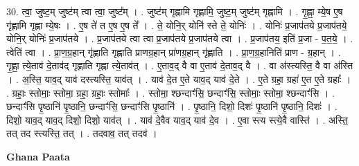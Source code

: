 \documentclass[17pt]{extarticle}
\begin{document}
30. त्वा॒ जुष्ट॒म् जुष्ट॑म् त्वा त्वा॒ जुष्ट᳚म् । . जुष्ट॑म् गृह्णामि गृह्णामि॒ जुष्ट॒म् जुष्ट॑म् गृह्णामि । . गृ॒ह्णा॒ म्ये॒ष ए॒ष गृ॑ह्णामि गृह्णा म्ये॒षः । . ए॒ष ते॑ त ए॒ष ए॒ष ते᳚ । . ते॒ योनि॒र् योनि॑ स्ते ते॒ योनिः॑ । . योनिः॑ प्र॒जाप॑तये प्र॒जाप॑तये॒ योनि॒र् योनिः॑ प्र॒जाप॑तये । . प्र॒जाप॑तये त्वा त्वा प्र॒जाप॑तये प्र॒जाप॑तये त्वा । . प्र॒जाप॑तय॒ इति॑ प्र॒जा - प॒त॒ये॒ । . त्वेति॑ त्वा । . प्रा॒ण॒ग्र॒हान् गृ॑ह्णाति गृह्णाति प्राणग्र॒हान् प्रा॑णग्र॒हान् गृ॑ह्णाति । . प्रा॒ण॒ग्र॒हानिति॑ प्राण - ग्र॒हान् । . गृ॒ह्णा॒ त्ये॒ताव॑ दे॒ताव॑द् गृह्णाति गृह्णा त्ये॒ताव॑त् । . ए॒ताव॒द् वै वा ए॒ताव॑ दे॒ताव॒द् वै । . वा अ॑स्त्यस्ति॒ वै वा अ॑स्ति । . अ॒स्ति॒ याव॒द् याव॑ दस्त्यस्ति॒ याव॑त् । . याव॑ दे॒त ए॒ते याव॒द् याव॑ दे॒ते । . ए॒ते ग्रहा॒ ग्रहा॑ ए॒त ए॒ते ग्रहाः᳚ । . ग्रहाः॒ स्तोमाः॒ स्तोमा॒ ग्रहा॒ ग्रहाः॒ स्तोमाः᳚ । . स्तोमा॒ श्छन्दाꣳ॑सि॒ छन्दाꣳ॑सि॒ स्तोमाः॒ स्तोमा॒ श्छन्दाꣳ॑सि । . छन्दाꣳ॑सि पृ॒ष्ठानि॑ पृ॒ष्ठानि॒ छन्दाꣳ॑सि॒ छन्दाꣳ॑सि पृ॒ष्ठानि॑ । . पृ॒ष्ठानि॒ दिशो॒ दिशः॑ पृ॒ष्ठानि॑ पृ॒ष्ठानि॒ दिशः॑ । . दिशो॒ याव॒द् याव॒द् दिशो॒ दिशो॒ याव॑त् । . याव॑ दे॒वैव याव॒द् याव॑ दे॒व । . ए॒वा स्त्य स्त्ये॒वै वास्ति॑ । . अस्ति॒ तत् तद स्त्यस्ति॒ तत् । . तदवाव॒ तत् तदव॑ । \newline

\textbf{Ghana Paata } \newline
\end{document}
